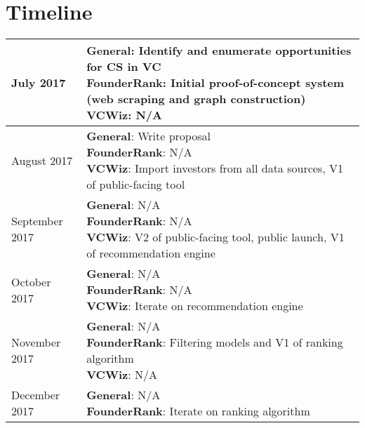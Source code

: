 \section{Timeline}

\begin{table}[ht]
\centering
\begin{tabular}{|l|l|}
  \hline
  July 2017 & \makecell{
          \textbf{General}: Identify and enumerate opportunities for CS in VC \\
          \textbf{FounderRank}: Initial proof-of-concept system (web scraping and graph construction) \\
          \textbf{VCWiz}: N/A \\
        } \\\hline
  August 2017 & \makecell{
                  \textbf{General}: Write proposal \\
                  \textbf{FounderRank}: N/A \\
                  \textbf{VCWiz}: Import investors from all data sources, V1 of public-facing tool \\
                } \\\hline
  September 2017 & \makecell{
                    \textbf{General}: N/A \\
                    \textbf{FounderRank}: N/A \\
                    \textbf{VCWiz}: V2 of public-facing tool, public launch, V1 of recommendation engine \\
                  } \\\hline
  October 2017 & \makecell{
                    \textbf{General}: N/A \\
                    \textbf{FounderRank}: N/A \\
                    \textbf{VCWiz}: Iterate on recommendation engine \\
                  } \\\hline
  November 2017 & \makecell{
                    \textbf{General}: N/A \\
                    \textbf{FounderRank}: Filtering models and V1 of ranking algorithm \\
                    \textbf{VCWiz}: N/A \\
                  } \\\hline
  December 2017 & \makecell{
                    \textbf{General}: N/A \\
                    \textbf{FounderRank}: Iterate on ranking algorithm \\
}
\end{tabular}
\end{table}
